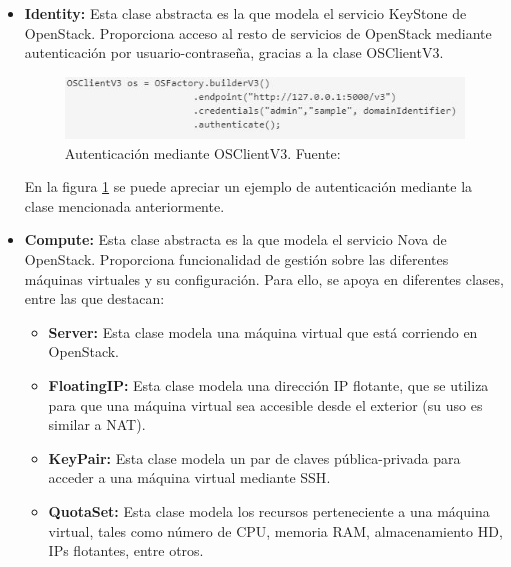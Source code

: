 \begin{itemize}
	
	\item \textbf{Identity:} Esta clase abstracta es la que modela el servicio KeyStone de OpenStack. Proporciona acceso al resto de servicios de OpenStack mediante autenticación por usuario-contraseña, gracias a la clase OSClientV3.
	
	\begin{figure}[!ht]
		\centering
		\includegraphics[width=1\linewidth]{imagenes/authOSClientV3}
		\caption{Autenticación mediante OSClientV3. Fuente:\cite{openstack4jbib}}
		\label{fig:authosclientv3}
	\end{figure}
	
	En la figura \ref{fig:authosclientv3} se puede apreciar un ejemplo de autenticación mediante la clase mencionada anteriormente. 
	
	\item \textbf{Compute:} Esta clase abstracta es la que modela el servicio Nova de OpenStack. Proporciona funcionalidad de gestión sobre las diferentes máquinas virtuales y su configuración. Para ello, se apoya en diferentes clases, entre las que destacan:
	
	\begin{itemize}
		
		\item \textbf{Server:} Esta clase modela una máquina virtual que está corriendo en OpenStack. 
		
		\item \textbf{FloatingIP:} Esta clase modela una dirección \ac{IP} flotante, que se utiliza para que una máquina virtual sea accesible desde el exterior (su uso es similar a \ac{NAT}).
		
		\item \textbf{KeyPair:} Esta clase modela un par de claves pública-privada para acceder a una máquina virtual mediante \ac{SSH}.
		
		\item \textbf{QuotaSet:} Esta clase modela los recursos perteneciente a una máquina virtual, tales como número de CPU, memoria RAM, almacenamiento HD, \ac{IP}s flotantes, entre otros.
		
		
	\end{itemize}
		

\end{itemize}
